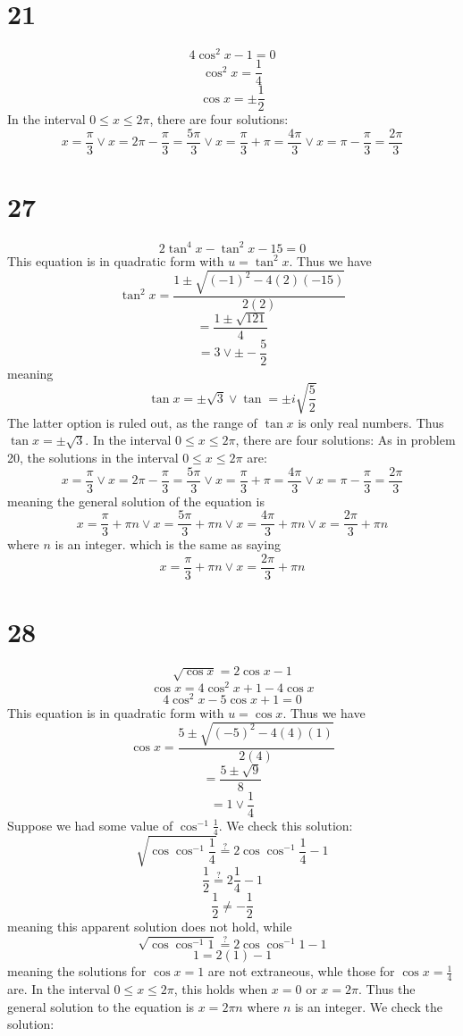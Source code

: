 \documentclass{article}
\theoremstyle{definition}
\newcommand{\?}{\stackrel{?}{=}}
\begin{document}
\section*{21}
\[ 4\cos^2 x-1=0 \]
\[ \cos^2 x=\frac{1}{4} \]
\[ \cos x=\pm\frac{1}{2} \]
In the interval $0\le x\le 2\pi$, there are four solutions:
\[ x=\frac{\pi}{3}\vee x=2\pi-\frac{\pi}{3}=\frac{5\pi}{3}\vee x=\frac{\pi}{3}+\pi=\frac{4\pi}{3}\vee x=\pi-\frac{\pi}{3}=\frac{2\pi}{3} \] 

\section*{27}
\[ 2\tan^4x-\tan^2x-15=0 \]
This equation is in quadratic form with $u=\tan^2 x$. Thus we have
\[ \tan^2 x=\frac{1\pm \sqrt{(-1)^2-4(2)(-15)}}{2(2)} \]
\[ =\frac{1\pm \sqrt{121}}{4} \]
\[ =3\vee \pm -\frac{5}{2} \]
meaning \[ \tan x=\pm\sqrt{3}\vee \tan=\pm i\sqrt{\frac{5}{2}} \] The latter option is ruled out, as the range of $\tan x$ is only real numbers. Thus 
$\tan x=\pm\sqrt{3}$. In the interval $0\le x\le 2\pi$, there are four solutions:
As in problem 20, the solutions in the interval $0\le x\le 2\pi$ are:
\[ x=\frac{\pi}{3}\vee x=2\pi-\frac{\pi}{3}=\frac{5\pi}{3}\vee x=\frac{\pi}{3}+\pi=\frac{4\pi}{3}\vee x=\pi-\frac{\pi}{3}=\frac{2\pi}{3} \]
meaning the general solution of the equation is
\[ x=\frac{\pi}{3}+\pi n\vee x=\frac{5\pi}{3}+\pi n\vee x=\frac{4\pi}{3}+\pi n\vee x=\frac{2\pi}{3}+\pi n \] where $n$ is an integer.
which is the same as saying
\[ x=\frac{\pi}{3}+\pi n\vee x=\frac{2\pi}{3}+\pi n \]

\section*{28}
\[ \sqrt{\cos x}=2\cos x-1 \]
\[ \cos x=4\cos^2 x+1-4\cos x \]
\[ 4\cos^2 x-5\cos x+1=0 \]
This equation is in quadratic form with $u=\cos x$. Thus we have
\[ \cos x=\frac{5\pm\sqrt{(-5)^2-4(4)(1)}}{2(4)} \]
\[ =\frac{5\pm\sqrt{9}}{8} \]
\[ =1\vee\frac{1}{4} \]
Suppose we had some value of $\cos^{-1}\frac{1}{4}$. We check this solution:
\[ \sqrt{\cos\cos^{-1}\frac{1}{4}}\? 2\cos\cos^{-1}\frac{1}{4} -1 \]
\[ \frac{1}{2}\? 2\frac{1}{4}-1 \]
\[ \frac{1}{2}\ne -\frac{1}{2} \] meaning this apparent solution does not hold, while
\[ \sqrt{\cos\cos^{-1}1}\? 2\cos\cos^{-1}1-1 \]
\[ 1=2(1)-1 \]
meaning the solutions for $\cos x=1$ are not extraneous, whle those for $\cos x=\frac{1}{4}$ are.
In the interval $0\le x\le 2\pi$, this holds when $x=0$ or $x=2\pi$. Thus the general solution to the equation is $x=2\pi n$ where $n$ is an integer.
We check the solution:
\end{document}
